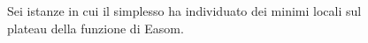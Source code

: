 \begin{figure}
	\label{fig:AbsoluteEasom}
\end{figure}

\begin{figure}
	\centering
	\caption{Sei istanze in cui il simplesso ha individuato dei minimi locali sul plateau della funzione di Easom.}
	

\end{figure}
